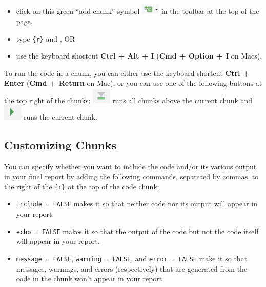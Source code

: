 \documentclass[
  letterpaper,
]{krantz}
\begin{document}
\begin{itemize}
\item
  click on this green ``add chunk'' symbol
  \includegraphics[width=0.34722in,height=\textheight]{book/images/12-add-chunk.png}
  in the toolbar at the top of the page,
\item
  type \texttt{\textasciigrave{}\textasciigrave{}\textasciigrave{}\{r\}}
  and \texttt{\textasciigrave{}\textasciigrave{}\textasciigrave{}}, OR
\item
  use the keyboard shortcut \textbf{Ctrl + Alt + I} (\textbf{Cmd +
  Option + I} on Macs).
\end{itemize}

To run the code in a chunk, you can either use the keyboard shortcut
\textbf{Ctrl + Enter} (\textbf{Cmd + Return} on Mac), or you can use one
of the following buttons at the top right of the chunks:
\includegraphics[width=0.34722in,height=\textheight]{book/images/12-run-all-chunks-above.png}
runs all chunks above the current chunk and
\includegraphics[width=0.34722in,height=\textheight]{book/images/12-run-current-chunk.png}
runs the current chunk.

\hypertarget{customizing-chunks}{%
\subsection{Customizing Chunks}\label{customizing-chunks}}

You can specify whether you want to include the code and/or its various
output in your final report by adding the following commands, separated
by commas, to the right of the \texttt{\{r\}} at the top of the code
chunk:

\begin{itemize}
\item
  \texttt{include\ =\ FALSE} makes it so that neither code nor its
  output will appear in your report.
\item
  \texttt{echo\ =\ FALSE} makes it so that the output of the code but
  not the code itself will appear in your report.
\item
  \texttt{message\ =\ FALSE}, \texttt{warning\ =\ FALSE}, and
  \texttt{error\ =\ FALSE} make it so that messages, warnings, and
  errors (respectively) that are generated from the code in the chunk
  won't appear in your report.
\end{itemize}
\end{document}
